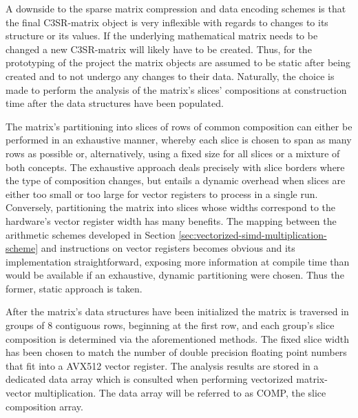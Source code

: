       A downside to the sparse matrix compression and data encoding schemes is that the final C3SR-matrix object is very
      inflexible with regards to changes to its structure or its values. If the underlying mathematical matrix needs to
      be changed a new C3SR-matrix will likely have to be created. Thus, for the prototyping of the project the matrix
      objects are assumed to be static after being created and to not undergo any changes to their data. Naturally, the
      choice is made to perform the analysis of the matrix's slices' compositions at construction time after the data
      structures have been populated. 

      The matrix's partitioning into slices of rows of common composition can either be performed in an exhaustive
      manner, whereby each slice is chosen to span as many rows as possible or, alternatively, using a fixed size for
      all slices or a mixture of both concepts. The exhaustive approach deals precisely with slice borders where the
      type of composition changes, but entails a dynamic overhead when slices are either too small or too large for
      vector registers to process in a single run. Conversely, partitioning the matrix into slices whose widths
      correspond to the hardware's vector register width has many benefits. The mapping between the arithmetic schemes
      developed in Section \ref{sec:vectorized-simd-multiplication-scheme} and instructions on vector registers becomes
      obvious and its implementation straightforward, exposing more information at compile time than would be available
      if an exhaustive, dynamic partitioning were chosen. Thus the former, static approach is taken.

      After the matrix's data structures have been initialized the matrix is traversed in groups of $8$ contiguous rows,
      beginning at the first row, and each group's slice composition is determined via the aforementioned methods. The
      fixed slice width has been chosen to match the number of double precision floating point numbers that fit into a
      AVX512 vector register. The analysis results are stored in a dedicated data array which is consulted when
      performing vectorized matrix-vector multiplication. The data array will be referred to as COMP, the slice
      composition array.

